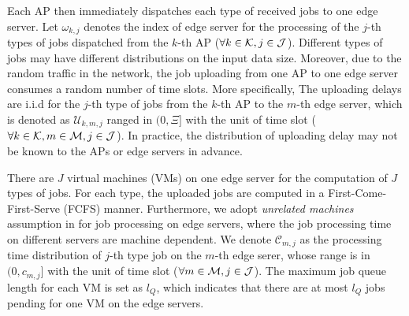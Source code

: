 Each AP then immediately dispatches each type of received jobs to one edge server.
Let $\omega_{k,j}$ denotes the index of edge server for the processing of the $j$-th types of jobs dispatched from the $k$-th AP ($\forall k\in\mathcal{K}, j\in\mathcal{J}$).
Different types of jobs may have different distributions on the input data size.
Moreover, due to the random traffic in the network, the job uploading from one AP to one edge server consumes a random number of time slots.
More specifically, The uploading delays are i.i.d for the $j$-th type of jobs from the $k$-th AP to the $m$-th edge server, which is denoted as $\mathcal{U}_{k,m,j}$ ranged in $(0,\Xi]$ with the unit of time slot ($\forall k\in\mathcal{K}, m\in\mathcal{M}, j\in\mathcal{J}$).
In practice, the distribution of uploading delay may not be known to the APs or edge servers in advance.

There are $J$ virtual machines (VMs) on one edge server for the computation of $J$ types of jobs.
For each type, the uploaded jobs are computed in a First-Come-First-Serve (FCFS) manner.
Furthermore, we adopt \emph{unrelated machines} assumption in \cite{tan-online} for job processing on edge servers, where the job processing time on different servers are machine dependent.
We denote $\mathcal{C}_{m,j}$ as the processing time distribution of $j$-th type job on the $m$-th edge serer, whose range is in $(0, c_{m,j}]$ with the unit of time slot ($\forall m\in\mathcal{M}, j\in\mathcal{J}$).
The maximum job queue length for each VM is set as $l_Q$, which indicates that there are at most $l_Q$ jobs pending for one VM on the edge servers. 

